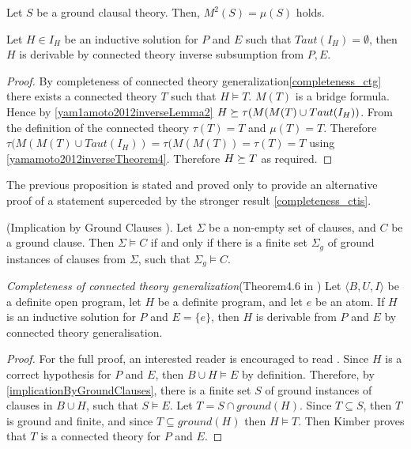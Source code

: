 \begin{thm}\label{yamamoto2012inverseTheorem4}\cite{yamamoto2012inverse}
Let $S$ be a ground clausal theory. Then, $M^2(S) = \mu(S)$ holds.
\end{thm}

\begin{proposition}
Let $H \in I_H$ be an inductive solution for $P$ and $E$ such that $Taut(I_H)=\emptyset$, then $H$ is derivable by connected theory inverse subsumption from $P, E$.
\end{proposition}
\begin{proof}
By completeness of connected theory generalization\ref{completeness_ctg} there exists a connected theory $T$ such that $H \models T$. $M(T)$ is a bridge formula.
Hence by \ref{yam1amoto2012inverseLemma2}
$H \succeq \tau(M(M(T) \cup Taut(I_H))$. From the definition of the connected theory $\tau(T)=T$ and $\mu (T)=T$.
Therefore $\tau(M(M(T) \cup Taut(I_H))=\tau(M(M(T))=\tau(T)=T$ using
\ref{yamamoto2012inverseTheorem4}. Therefore $H \succeq T$ as required.
\end{proof}
\begin{remark}
The previous proposition is stated and proved only to provide an alternative proof of a statement superceded by the stronger result \ref{completeness_ctis}.
\end{remark}

\begin{thm}\label{implicationByGroundClauses}
(Implication by Ground Clauses \cite{nienhuys1997foundations}). Let $\Sigma$ be a non-empty set of clauses,
and $C$ be a ground clause. Then $\Sigma \models C$ if and only if there is a finite set $\Sigma_g$ of ground
instances of clauses from $\Sigma$, such that $\Sigma_g \models C$.
\end{thm}

\begin{thm}\label{completeness_ctg}
\emph{Completeness of connected theory generalization}(Theorem4.6 in \cite{kimber2012learning})
Let $\langle B, U, I \rangle$ be a definite open program,
let $H$ be a definite program, and let $e$ be an atom.
If $H$ is an inductive solution for $P$ and
$E = \{e\}$, then $H$ is derivable from $P$ and $E$ by connected theory generalisation.
\end{thm}
\begin{proof}\cite{kimber2012learning}
For the full proof, an interested reader is encouraged to read \cite{kimber2012learning}.
Since $H$ is a correct hypothesis for $P$ and $E$,
then $B \cup H \models E$ by definition.
Therefore, by \ref{implicationByGroundClauses}, there is a finite set $S$ of ground instances of clauses in $B \cup H$,
such that $S \models E$. Let $T = S \cap ground(H)$.
Since $T \subseteq S$, then $T$ is ground and finite, and
since $T \subseteq ground(H)$ then $H \models T$. 
Then Kimber proves that $T$ is a connected theory for $P$ and $E$.
\end{proof}

